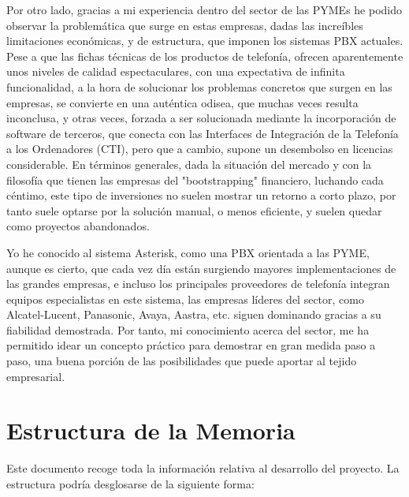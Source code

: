 Por otro lado, gracias a mi experiencia dentro del sector de las PYMEs he podido observar la problemática que surge en estas empresas, dadas las increíbles limitaciones económicas, y de estructura, que imponen los sistemas PBX actuales. Pese a que las fichas técnicas de los productos de telefonía, ofrecen aparentemente unos niveles de calidad espectaculares, con una expectativa de infinita funcionalidad, a la hora de solucionar los problemas concretos que surgen en las empresas, se convierte en una auténtica odisea, que muchas veces resulta inconclusa, y otras veces, forzada a ser solucionada mediante la incorporación de software de terceros, que conecta con las Interfaces de Integración de la Telefonía a los Ordenadores (CTI), pero que a cambio, supone un desembolso en licencias considerable. En términos generales, dada la situación del mercado y con la filosofía que tienen las empresas del "bootstrapping" financiero, luchando cada céntimo, este tipo de inversiones no suelen mostrar un retorno a corto plazo, por tanto suele optarse por la solución manual, o menos eficiente, y suelen quedar como proyectos abandonados.

Yo he conocido al sistema Asterisk, como una PBX orientada a las PYME, aunque es cierto, que cada vez día están surgiendo mayores implementaciones de las grandes empresas, e incluso los principales proveedores de telefonía integran equipos especialistas en este sistema, las empresas líderes del sector, como Alcatel-Lucent, Panasonic, Avaya, Aastra, etc. siguen dominando gracias a su fiabilidad demostrada. Por tanto, mi conocimiento acerca del sector, me ha permitido idear un concepto práctico para demostrar en gran medida paso a paso, una buena porción de las posibilidades que puede aportar al tejido empresarial.

\section{Estructura de la Memoria}

Este documento recoge toda la información relativa al desarrollo del proyecto. La estructura podría desglosarse de la siguiente forma:

